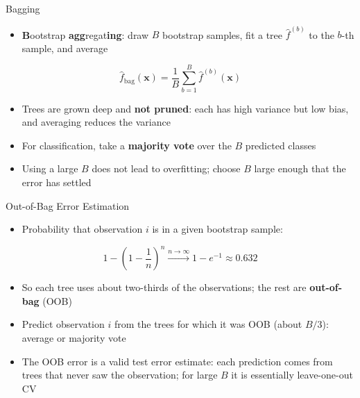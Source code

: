 \begin{frame}{Bagging}
    \begin{itemize}
        \item \textbf{B}ootstrap \textbf{agg}regat\textbf{ing}: draw $B$ bootstrap samples, fit a tree $\hat{f}^{(b)}$ to the $b$-th sample, and average
    \end{itemize}
    \[
        \hat{f}_{\mathrm{bag}}(\mathbf{x}) = \frac{1}{B} \sum_{b=1}^{B} \hat{f}^{(b)}(\mathbf{x})
    \]
    \begin{itemize}
        \item Trees are grown deep and \textbf{not pruned}: each has high variance but low bias, and averaging reduces the variance
        \item For classification, take a \textbf{majority vote} over the $B$ predicted classes
        \item Using a large $B$ does not lead to overfitting; choose $B$ large enough that the error has settled
    \end{itemize}
\end{frame}


\begin{frame}{Out-of-Bag Error Estimation}
    \begin{itemize}
        \item Probability that observation $i$ is in a given bootstrap sample:
    \end{itemize}
    \[
        1 - \left( 1 - \frac{1}{n} \right)^{n} \xrightarrow{n \to \infty} 1 - e^{-1} \approx 0.632
    \]
    \begin{itemize}
        \item So each tree uses about two-thirds of the observations; the rest are \textbf{out-of-bag} (OOB)
        \item Predict observation $i$ from the trees for which it was OOB (about $B/3$): average or majority vote
        \item The OOB error is a valid test error estimate: each prediction comes from trees that never saw the observation; for large $B$ it is essentially leave-one-out CV
    \end{itemize}
\end{frame}


